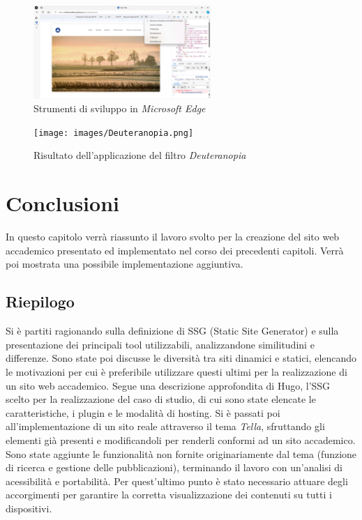 \documentclass[target=bach,aauheader=]{thud}
\begin{document}
\begin{figure}
    \centering
    \includegraphics[width = 0.6\textwidth]{images/dev-tools.png}
    \caption{Strumenti di sviluppo in \textit{Microsoft Edge}}
\end{figure}

\begin{figure}
    \centering
    \texttt{[image: images/Deuteranopia.png]}
    \caption{Risultato dell'applicazione del filtro \textit{Deuteranopia}}
    \label{img:deuteranopia}
\end{figure}

\chapter{Conclusioni}
In questo capitolo verrà riassunto il lavoro svolto per la creazione del sito web accademico presentato ed implementato nel corso dei precedenti capitoli. 
Verrà poi mostrata una possibile implementazione aggiuntiva.

\section{Riepilogo}
Si è partiti ragionando sulla definizione di SSG (Static Site Generator) e sulla presentazione dei principali tool utilizzabili, analizzandone similitudini e differenze.
Sono state poi discusse le diversità tra siti dinamici e statici, elencando le motivazioni per cui è preferibile utilizzare questi ultimi per la realizzazione di un sito web accademico.   
\newline
Segue una descrizione approfondita di Hugo, l'SSG scelto per la realizzazione del caso di studio, di cui sono state elencate le caratteristiche, i plugin e le modalità di hosting.
Si è passati poi all'implementazione di un sito reale attraverso il tema \textit{Tella}, sfruttando gli elementi già presenti e modificandoli per renderli conformi ad un sito accademico. 
Sono state aggiunte le funzionalità non fornite originariamente dal tema (funzione di ricerca e gestione delle pubblicazioni), terminando il lavoro con un'analisi di acessibilità e portabilità. 
Per quest'ultimo punto è stato necessario attuare degli accorgimenti per garantire la corretta visualizzazione dei contenuti su tutti i dispositivi.  
\end{document}
